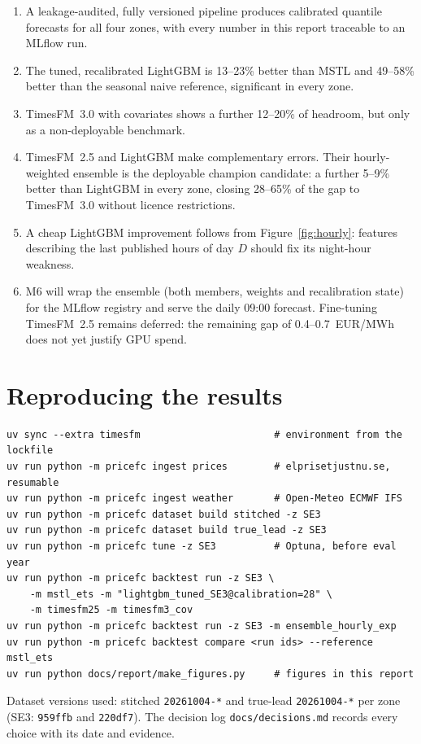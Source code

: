 \documentclass[11pt,a4paper]{article}
\newcommand{\code}[1]{\texttt{#1}}
\begin{document}
\begin{enumerate}
\item A leakage-audited, fully versioned pipeline produces calibrated quantile forecasts for all
four zones, with every number in this report traceable to an MLflow run.
\item The tuned, recalibrated LightGBM is 13--23\% better than MSTL and 49--58\% better than the
seasonal naive reference, significant in every zone.
\item TimesFM~3.0 with covariates shows a further 12--20\% of headroom, but only as a
non-deployable benchmark.
\item TimesFM~2.5 and LightGBM make complementary errors. Their hourly-weighted ensemble is the
deployable champion candidate: a further 5--9\% better than LightGBM in every zone, closing
28--65\% of the gap to TimesFM~3.0 without licence restrictions.
\item A cheap LightGBM improvement follows from Figure~\ref{fig:hourly}: features describing the
last published hours of day $D$ should fix its night-hour weakness.
\item M6 will wrap the ensemble (both members, weights and recalibration state) for the MLflow
registry and serve the daily 09:00 forecast. Fine-tuning TimesFM~2.5 remains deferred: the
remaining gap of 0.4--0.7~EUR/MWh does not yet justify GPU spend.
\end{enumerate}

\appendix
\section{Reproducing the results}
\begin{verbatim}
uv sync --extra timesfm                       # environment from the lockfile
uv run python -m pricefc ingest prices        # elprisetjustnu.se, resumable
uv run python -m pricefc ingest weather       # Open-Meteo ECMWF IFS
uv run python -m pricefc dataset build stitched -z SE3
uv run python -m pricefc dataset build true_lead -z SE3
uv run python -m pricefc tune -z SE3          # Optuna, before eval year
uv run python -m pricefc backtest run -z SE3 \
    -m mstl_ets -m "lightgbm_tuned_SE3@calibration=28" \
    -m timesfm25 -m timesfm3_cov
uv run python -m pricefc backtest run -z SE3 -m ensemble_hourly_exp
uv run python -m pricefc backtest compare <run ids> --reference mstl_ets
uv run python docs/report/make_figures.py     # figures in this report
\end{verbatim}
Dataset versions used: stitched \code{20261004-*} and true-lead \code{20261004-*} per zone
(SE3: \code{959ffb} and \code{220df7}). The decision log \code{docs/decisions.md} records every
choice with its date and evidence.
\end{document}
